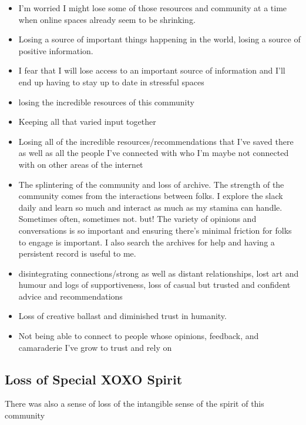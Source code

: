 \documentclass[
]{book}
\providecommand{\tightlist}{%
  \setlength{\itemsep}{0pt}\setlength{\parskip}{0pt}}
\begin{document}
\begin{itemize}
\tightlist
\item
  I'm worried I might lose some of those resources and community at a time when online spaces already seem to be shrinking.
\item
  Losing a source of important things happening in the world, losing a source of positive information.
\item
  I fear that I will lose access to an important source of information and I'll end up having to stay up to date in stressful spaces
\item
  losing the incredible resources of this community
\item
  Keeping all that varied input together
\item
  Losing all of the incredible resources/recommendations that I've saved there as well as all the people I've connected with who I'm maybe not connected with on other areas of the internet
\item
  The splintering of the community and loss of archive. The strength of the community comes from the interactions between folks. I explore the slack daily and learn so much and interact as much as my stamina can handle. Sometimes often, sometimes not. but! The variety of opinions and conversations is so important and ensuring there's minimal friction for folks to engage is important. I also search the archives for help and having a persistent record is useful to me.
\item
  disintegrating connections/strong as well as distant relationships, lost art and humour and logs of supportiveness, loss of casual but trusted and confident advice and recommendations
\item
  Loss of creative ballast and diminished trust in humanity.
\item
  Not being able to connect to people whose opinions, feedback, and camaraderie I've grow to trust and rely on
\end{itemize}

\subsection{Loss of Special XOXO Spirit}\label{loss-of-special-xoxo-spirit}

There was also a sense of loss of the intangible sense of the spirit of this community
\end{document}

